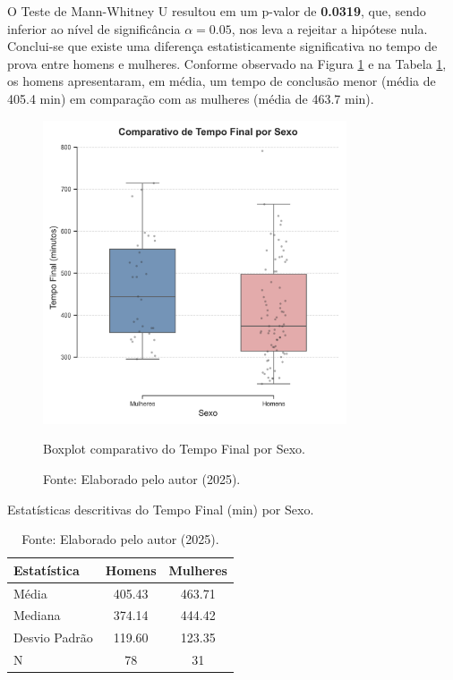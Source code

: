O Teste de Mann-Whitney U resultou em um p-valor de \textbf{0.0319}, que, sendo inferior ao nível de significância $\alpha=0.05$, nos leva a rejeitar a hipótese nula. Conclui-se que existe uma diferença estatisticamente significativa no tempo de prova entre homens e mulheres. Conforme observado na Figura \ref{fig:boxplot_sexo} e na Tabela \ref{tab:descritiva_sexo}, os homens apresentaram, em média, um tempo de conclusão menor (média de 405.4 min) em comparação com as mulheres (média de 463.7 min).

\begin{figure}[H]
    \centering
    \includegraphics[width=0.8\textwidth]{Imagens/boxplot_tempo_por_sexo.png}
    \caption{Boxplot comparativo do Tempo Final por Sexo.}
    \label{fig:boxplot_sexo}
    \caption*{Fonte: Elaborado pelo autor (2025).}
\end{figure}

\begin{table}[H]
\centering
\caption{Estatísticas descritivas do Tempo Final (min) por Sexo.}
\label{tab:descritiva_sexo}
\begin{tabular}{lcc}
\toprule
\textbf{Estatística} & \textbf{Homens} & \textbf{Mulheres} \\
\midrule
Média   & 405.43 & 463.71 \\
Mediana & 374.14 & 444.42 \\
Desvio Padrão & 119.60 & 123.35 \\
N       & 78     & 31     \\
\bottomrule
\end{tabular}
\caption*{Fonte: Elaborado pelo autor (2025).}
\end{table}

